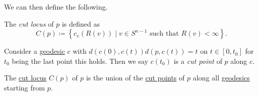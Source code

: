 We can then define the following.

\begin{definition}\label{def:cut-locus}
	The \emph{cut locus} of \(p\) is defined as
	\[
		C(p) \coloneqq \left\{ c_v(R(v)) \mid v\in S^{n-1} \text{ such that } R(v) < \infty \right\}.
	\]
\end{definition}

\begin{definition}\label{def:cut-point}
	Consider a \hyperref[def:geodesic]{geodesic} \(c\) with \(d(c(0), c(t)) d(p, c(t)) = t\) on \(t \in [0, t_0]\) for \(t_0\) being the last point this holds. Then we say \(c(t_0)\) is a \emph{cut point} of \(p\) along \(c\).
\end{definition}

\begin{intuition}
	The \hyperref[def:cut-locus]{cut locus} \(C(p)\) of \(p\) is the union of the \hyperref[def:cut-point]{cut points} of \(p\) along all \hyperref[def:geodesic]{geodesics} starting from \(p\).
\end{intuition}